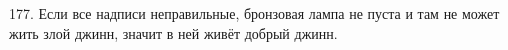 177. Если все надписи неправильные, бронзовая лампа не пуста и там не может жить злой джинн, значит в ней живёт добрый джинн.\\
